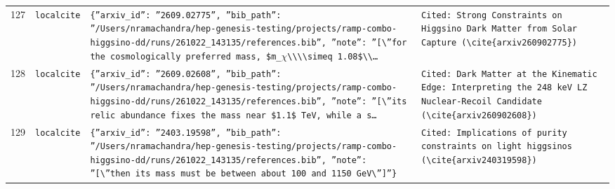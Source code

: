 \documentclass[11pt,a4paper]{article}
\begin{document}
\begin{longtable}{@{}p{}p{}p{}p{}@{}}
127 & \texttt{local}\newline\texttt{cite} & \texttt{\{''arxiv\_\allowbreak{}id'':\allowbreak{} ''2609.02775'',\allowbreak{} ''bib\_\allowbreak{}path'':\allowbreak{} ''/\allowbreak{}Users/\allowbreak{}nramachandra/\allowbreak{}hep-genesis-testing/\allowbreak{}projects/\allowbreak{}ramp-combo-higgsino-dd/\allowbreak{}runs/\allowbreak{}261022\_\allowbreak{}143135/\allowbreak{}references.bib'',\allowbreak{} ''note'':\allowbreak{} ''[\textbackslash{}\allowbreak{}''for the cosmologically preferred mass,\allowbreak{} \$m\_\allowbreak{}$\chi$\textbackslash{}\allowbreak{}\textbackslash{}\allowbreak{}\textbackslash{}\allowbreak{}\textbackslash{}\allowbreak{}simeq 1.08\$\textbackslash{}\allowbreak{}\textbackslash{}\allowbreak{}\ldots{}\allowbreak{}} & \texttt{Cited:\allowbreak{} Strong Constraints on Higgsino Dark Matter from Solar Capture (\textbackslash{}\allowbreak{}cite\{arxiv260902775\}\allowbreak{})\allowbreak{}} \\
128 & \texttt{local}\newline\texttt{cite} & \texttt{\{''arxiv\_\allowbreak{}id'':\allowbreak{} ''2609.02608'',\allowbreak{} ''bib\_\allowbreak{}path'':\allowbreak{} ''/\allowbreak{}Users/\allowbreak{}nramachandra/\allowbreak{}hep-genesis-testing/\allowbreak{}projects/\allowbreak{}ramp-combo-higgsino-dd/\allowbreak{}runs/\allowbreak{}261022\_\allowbreak{}143135/\allowbreak{}references.bib'',\allowbreak{} ''note'':\allowbreak{} ''[\textbackslash{}\allowbreak{}''its relic abundance fixes the mass near \$1.1\$ TeV,\allowbreak{} while a s\ldots{}\allowbreak{}} & \texttt{Cited:\allowbreak{} Dark Matter at the Kinematic Edge:\allowbreak{} Interpreting the 248 keV LZ Nuclear-Recoil Candidate (\textbackslash{}\allowbreak{}cite\{arxiv260902608\}\allowbreak{})\allowbreak{}} \\
129 & \texttt{local}\newline\texttt{cite} & \texttt{\{''arxiv\_\allowbreak{}id'':\allowbreak{} ''2403.19598'',\allowbreak{} ''bib\_\allowbreak{}path'':\allowbreak{} ''/\allowbreak{}Users/\allowbreak{}nramachandra/\allowbreak{}hep-genesis-testing/\allowbreak{}projects/\allowbreak{}ramp-combo-higgsino-dd/\allowbreak{}runs/\allowbreak{}261022\_\allowbreak{}143135/\allowbreak{}references.bib'',\allowbreak{} ''note'':\allowbreak{} ''[\textbackslash{}\allowbreak{}''then its mass must be between about 100 and 1150 GeV\textbackslash{}\allowbreak{}'']\allowbreak{}''\}\allowbreak{}} & \texttt{Cited:\allowbreak{} Implications of purity constraints on light higgsinos (\textbackslash{}\allowbreak{}cite\{arxiv240319598\}\allowbreak{})\allowbreak{}} \\

\end{longtable}
\end{document}
